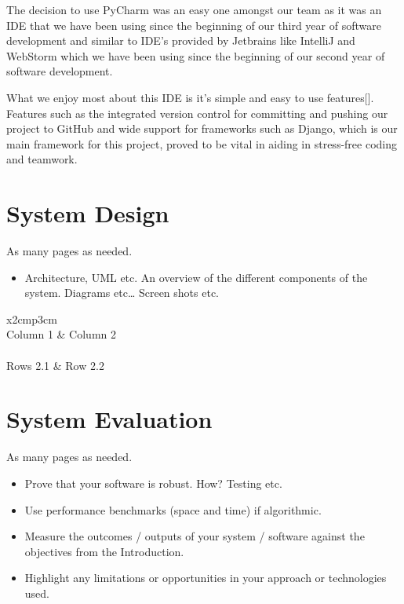 The decision to use PyCharm was an easy one amongst our team as it was an IDE that we have been using since the beginning of our third year of software development and similar to IDE's provided by Jetbrains like IntelliJ and WebStorm which we have been using since the beginning of our second year of software development.

What we enjoy most about this IDE is it's simple and easy to use features[]. Features such as the integrated version control for committing and pushing our project to GitHub and wide support for frameworks such as Django, which is our main framework for this project, proved to be vital in aiding in stress-free coding and teamwork.
















\chapter{System Design}
As many pages as needed.
\begin{itemize}
\item Architecture, UML etc. An overview of the different components of the system. Diagrams etc… Screen shots etc.
\end{itemize}

\begin{table}[h]
  \centering
  \begin{tabular}{x{2cm}p{3cm}}
    \toprule \\
    Column 1 & Column 2 \\
    \midrule \\
    Rows 2.1 & Row 2.2 \\
    \bottomrule
  \end{tabular}
  \caption{A table.}
  \label{table:mytable}
\end{table}

\chapter{System Evaluation}
As many pages as needed.
\begin{itemize}
\item Prove that your software is robust. How? Testing etc.
\item Use performance benchmarks (space and time) if algorithmic.
\item Measure the outcomes / outputs of your system / software against the objectives from the Introduction.
\item Highlight any limitations or opportunities in your approach or technologies used.
\end{itemize}


